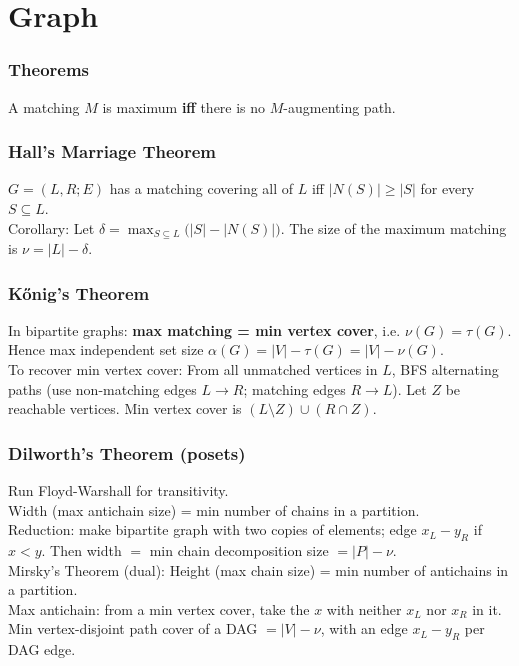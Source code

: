 \chapter{Graph}

\subsection{Theorems}

  	A matching $M$ is maximum \textbf{iff} there is no $M$-augmenting path. \\

	\subsection{Hall's Marriage Theorem}
		$G = (L, R; E)$ has a matching covering all of $L$ iff $|N(S)| \ge |S|$ for every $S \subseteq L$. \\
		Corollary: Let $\delta=\max_{S\subseteq L}\big(|S|-|N(S)|\big)$. The size of the maximum matching is $\nu = |L|-\delta$. \\

	\subsection{Kőnig's Theorem}
 		In bipartite graphs: \textbf{max matching = min vertex cover}, i.e. $\nu(G)=\tau(G)$.
		Hence max independent set size $\alpha(G)=|V|-\tau(G)=|V|-\nu(G)$. \\

		To recover min vertex cover: 
		From all unmatched vertices in $L$, BFS alternating paths (use non-matching edges $L\!\to\!R$; matching edges $R\!\to\!L$).
		Let $Z$ be reachable vertices. Min vertex cover is $(L\setminus Z)\cup(R\cap Z)$. \\

	\subsection{Dilworth's Theorem (posets)}
		Run Floyd-Warshall for transitivity. \\
		Width (max antichain size) = min number of chains in a partition. \\
		Reduction: make bipartite graph with two copies of elements; edge $x_L\!-\!y_R$ if $x<y$. Then
		width $=$ min chain decomposition size $= |P|-\nu$. \\
		Mirsky's Theorem (dual): Height (max chain size) = min number of antichains in a partition. \\
		Max antichain: from a min vertex cover, take the $x$ with neither $x_L$ nor $x_R$ in it. \\
		Min vertex-disjoint path cover of a DAG $=|V|-\nu$, with an edge $x_L\!-\!y_R$ per DAG edge. \\

